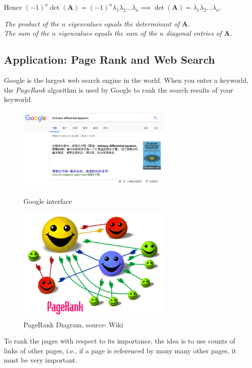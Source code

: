 Hence $(-1)^{n}\det(\bm A)=(-1)^n\lambda_1\lambda_2\dots\lambda_n\implies
\det(\bm A)=\lambda_1\lambda_2\dots\lambda_n.$

\begin{theorem}
\emph{\textit{The product of the $n$ eigenvalues equals the determinant of $\bm A$.}}\\
\emph{\textit{The sum of the $n$ eigenvalues equals the sum of the $n$ diagonal entries of $\bm A$.}}
\end{theorem}

\subsection{Application: Page Rank and Web Search}
Google is the largest web search engine in the world. When you enter a keyworld, the \textit{PageRank} algorithm is used by Google to rank the search results of your keyworld.
\begin{figure}[H]
    \begin{minipage}[b]{0.5\textwidth} 
      \centering 
      \includegraphics[width=3in]{week6/Fig_1.png} 
      \caption{Google interface}
    \end{minipage}%
    \begin{minipage}[b]{0.5\textwidth} 
      \centering 
      \includegraphics[width=3in]{week6/Fig_2.png}
      \caption{PageRank Diagram, source: Wiki}
    \end{minipage}
\end{figure}
To rank the pages with respect to its importance, the idea is to use counts of links of other pages, i.e., if a page is referenced by many many other pages, it must be very important.
